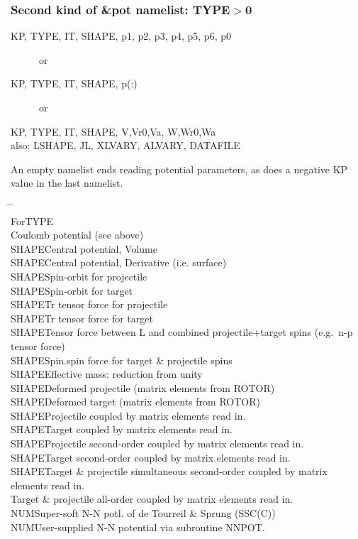 \documentclass[11pt]{article}
\begin{document}
\subsubsection{Second kind of \&pot namelist: TYPE$>$0}

\begin{description}
\item[KP, TYPE,  IT, SHAPE, p1, p2, p3, p4, p5, p6, p0] or 
\item[KP, TYPE,  IT, SHAPE, p(:)] or 
\item[KP, TYPE, IT, SHAPE,  V,Vr0,Va,   W,Wr0,Wa] 
\item[{\rm also}: LSHAPE, JL, XLVARY, ALVARY, DATAFILE]
\end{description}

An empty namelist  ends reading potential parameters, as does a negative KP value in the last namelist.
\begin{tabbing}
\hspace*{5mm} \= \hspace*{1cm} \= \hspace*{2cm} \= \\
For\>TYPE\\
\> \>Coulomb potential (see above)\\
\>SHAPE\>Central potential, Volume\\
\>SHAPE\>Central potential, Derivative (i.e. surface)\\
\>SHAPE\>Spin-orbit for projectile\\
\>SHAPE\>Spin-orbit for target\\
\>SHAPE\>Tr tensor force for projectile\\
\>SHAPE\>Tr tensor force for target\\
\>SHAPE\>Tensor force between L and combined projectile+target spins
(e.g.~n-p tensor force)\\
\>SHAPE\>Spin.spin force for target \& projectile spins\\
\>SHAPE\>Effective mass: reduction from unity\\
\>SHAPE\>Deformed projectile   (matrix elements from ROTOR)\\
\>SHAPE\>Deformed target       (matrix elements from ROTOR)\\
\>SHAPE\>Projectile coupled by matrix elements read in.\\
\>SHAPE\>Target     coupled by matrix elements read in.\\
\>SHAPE\>Projectile second-order coupled by matrix elements read in.\\
\>SHAPE\>Target second-order coupled by matrix elements read in.\\
\>SHAPE\>Target \& projectile simultaneous second-order coupled by matrix elements read in.\\
\>     \>Target \& projectile all-order coupled by matrix elements read in.\\
\>NUM\>Super-soft N-N potl. of de Tourreil \& Sprung (SSC(C))\\
\>NUM\>User-supplied N-N potential via subroutine NNPOT.
\end{tabbing}
\end{document}
